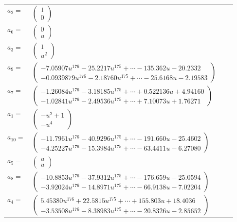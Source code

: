\documentclass[1p]{elsarticle_modified}
\theoremstyle{definition}
\begin{document}
\begin{tabular}{m{7pt} m{180pt} m{7pt} m{180pt} }
\flushright $a_{2}=$&$\begin{pmatrix}1\\0\end{pmatrix}$ \\
\flushright $a_{6}=$&$\begin{pmatrix}0\\u\end{pmatrix}$ \\
\flushright $a_{3}=$&$\begin{pmatrix}1\\u^2\end{pmatrix}$ \\
\flushright $a_{9}=$&$\begin{pmatrix}-7.05907 u^{176}-25.2217 u^{175}+\cdots-135.362 u-20.2332\\-0.0939879 u^{176}-2.18760 u^{175}+\cdots-25.6168 u-2.19583\end{pmatrix}$ \\
\flushright $a_{7}=$&$\begin{pmatrix}-1.26084 u^{176}-3.18185 u^{175}+\cdots+0.522136 u+4.94160\\-1.02841 u^{176}-2.49536 u^{175}+\cdots+7.10073 u+1.76271\end{pmatrix}$ \\
\flushright $a_{1}=$&$\begin{pmatrix}- u^2+1\\- u^4\end{pmatrix}$ \\
\flushright $a_{10}=$&$\begin{pmatrix}-11.7961 u^{176}-40.9296 u^{175}+\cdots-191.660 u-25.4602\\-4.25227 u^{176}-15.3984 u^{175}+\cdots-63.4411 u-6.27080\end{pmatrix}$ \\
\flushright $a_{5}=$&$\begin{pmatrix}u\\u\end{pmatrix}$ \\
\flushright $a_{8}=$&$\begin{pmatrix}-10.8853 u^{176}-37.9312 u^{175}+\cdots-176.659 u-25.0594\\-3.92024 u^{176}-14.8971 u^{175}+\cdots-66.9138 u-7.02204\end{pmatrix}$ \\
\flushright $a_{4}=$&$\begin{pmatrix}5.45380 u^{176}+22.5815 u^{175}+\cdots+155.803 u+18.4036\\-3.53508 u^{176}-8.38983 u^{175}+\cdots-20.8326 u-2.85652\end{pmatrix}$ \\

\end{tabular}
\end{document}
